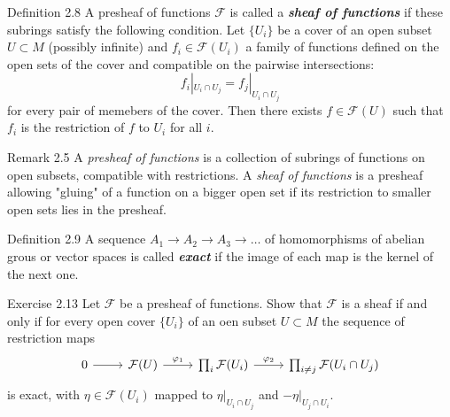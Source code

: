 \begin{thing3}{Definition 2.8}\leavevmode
	A presheaf of functions $\mathcal{F}$ is called a \textit{\textbf{sheaf of functions}} if these subrings satisfy the following condition. Let $\{U_i\}$ be a cover of an open subset $U\subset M$ (possibly infinite) and $f_i \in \mathcal{F}(U_i)$ a family of functions defined on the open sets of the cover and compatible on the pairwise intersections:
	\[f_i|_{U_i\cap U_j}=f_j|_{U_i \cap U_j}\]
	for every pair of memebers of the cover. Then there exists $f \in \mathcal{F}(U)$ such that $f_i$ is the restriction of $f$ to $U_i$ for all $i$.
\end{thing3}

\begin{thing5}{Remark 2.5}\leavevmode
	A \textit{presheaf of functions} is a collection of subrings of functions on open subsets, compatible with restrictions. A \textit{sheaf of functions} is a presheaf allowing "gluing" of a function on a bigger open set if its restriction to smaller open sets lies in the presheaf.
\end{thing5}

\begin{thing3}{Definition 2.9}\leavevmode
	A sequence $A_1 \longrightarrow A_2 \longrightarrow A_3 \longrightarrow \ldots$ of homomorphisms of abelian grous or vector spaces is called \textit{\textbf{exact}} if the image of each map is the kernel of the next one.
\end{thing3}

\begin{thing4}{Exercise 2.13}\label{exer:2.13}\leavevmode
Let $ \mathcal{F}$ be a presheaf of functions. Show that $\mathcal{F}$ is a sheaf if and only if for every open cover $\{ U_i\}$ of an oen subset $U\subset M$ the sequence of restriction maps
\[\begin{tikzcd}0\arrow[r]&\mathcal{F}(U)\arrow[r,"\varphi_1"]&\prod_{i}\mathcal{F}(U_i)\arrow[r,"\varphi_2"]&\prod_{i \neq  j}\mathcal{F}(U_i \cap U_j)\end{tikzcd}\]
 is exact, with $\eta \in \mathcal{F}(U_i)$ mapped to $\eta|_{U_i \cap U_j}$ and $-\eta|_{U_j \cap U_i}$.
\end{thing4}

